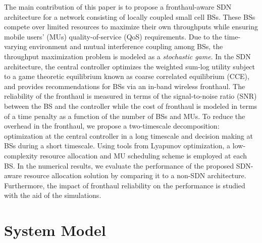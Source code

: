 \documentclass[conference]{IEEEtran}
\begin{document}
The main contribution of this paper is to propose a fronthaul-aware SDN architecture for a network consisting of locally coupled small cell BSs. These BSs compete over limited resources to maximize their own throughputs while ensuring mobile users' (MUs) quality-of-service (QoS) requirements.
 Due to the time-varying environment and mutual interference coupling among BSs, the throughput maximization problem is modeled as a {\it stochastic game}. In the SDN architecture, the central controller optimizes the weighted sum-log utility subject to a game theoretic equilibrium known as coarse correlated equilibrium (CCE), and provides recommendations for BSs via an in-band wireless fronthaul.
 The reliability of the fronthaul is measured in terms of the signal-to-noise ratio (SNR) between the BS and the controller
%
while the cost of fronthaul is modeled in terms of a time penalty as a function of the number of BSs and MUs. To reduce the overhead in the fronthaul, we propose a two-timescale decomposition: optimization at the central controller in a long timescale and decision making at BSs during a short timescale.
Using tools from Lyapunov optimization, a low-complexity  resource allocation and MU scheduling scheme is employed at each BS.
In the numerical results, we evaluate the performance of the proposed SDN-aware resource allocation solution by comparing it to a non-SDN architecture. Furthermore, the impact of fronthaul reliability on the performance  is studied with the aid of the simulations.






\section{System Model}\label{Sec: System model}
\end{document}
